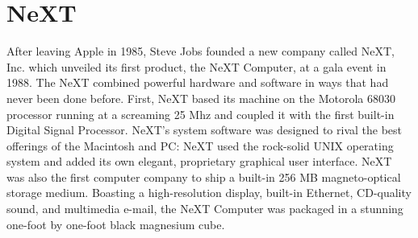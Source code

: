 \section{NeXT}
After leaving Apple in 1985, Steve Jobs founded a new company called NeXT, Inc. which unveiled its first product, the NeXT Computer, at a gala event in 1988. The NeXT combined powerful hardware and software in ways that had never been done before. First, NeXT based its machine on the Motorola 68030 processor running at a screaming 25 Mhz and coupled it with the first built-in Digital Signal Processor.  NeXT's system software was designed to rival the best offerings of the Macintosh and PC: NeXT used the rock-solid UNIX operating system and added its own elegant, proprietary graphical user interface.  NeXT was also the first computer company to ship a built-in 256 MB magneto-optical storage medium.  Boasting a high-resolution display, built-in Ethernet, CD-quality sound, and multimedia e-mail, the NeXT Computer was packaged in a stunning one-foot by one-foot black magnesium cube.\\
\par

